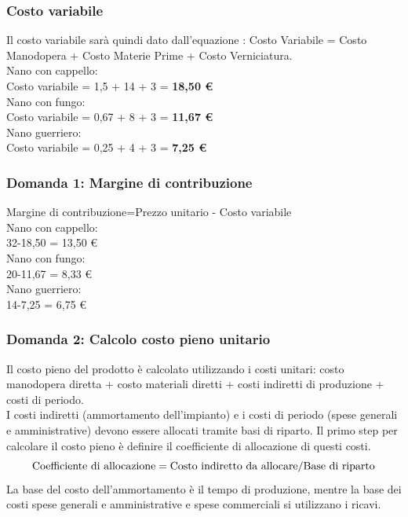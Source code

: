 \documentclass{article}
\begin{document}
\subsubsection*{Costo variabile}
Il costo variabile sarà quindi dato dall'equazione : Costo Variabile = Costo Manodopera + Costo Materie Prime + Costo Verniciatura.
\vspace*{0.1cm}\\
Nano con cappello:\\
Costo variabile = 1,5 + 14 + 3 = \textbf{18,50 €}
\vspace*{0.1cm}\\
Nano con fungo:\\
Costo variabile = 0,67 + 8 + 3 = \textbf{11,67 €}
\vspace*{0.1cm}\\
Nano guerriero:\\
Costo variabile = 0,25 + 4 + 3 = \textbf{7,25 €}
\vspace*{0.2cm}\\

\subsubsection{Domanda 1: Margine di contribuzione}
Margine di contribuzione=Prezzo unitario - Costo variabile
\vspace*{0.2cm}\\
Nano con cappello:\\
32-18,50 = 13,50 \euro 
\vspace*{0.1cm}\\
Nano con fungo:\\
20-11,67 = 8,33 \euro 
\vspace*{0.1cm}\\
Nano guerriero:\\
14-7,25 = 6,75 \euro 

\subsubsection{Domanda 2: Calcolo costo pieno unitario}
Il costo pieno del prodotto è calcolato utilizzando i costi unitari: costo manodopera diretta + costo materiali diretti + costi indiretti di produzione + costi di periodo.\\
I costi indiretti (ammortamento dell'impianto) e i costi di periodo (spese generali e amministrative) devono essere allocati tramite basi di riparto. Il primo step per calcolare il costo pieno è definire il coefficiente di allocazione di questi costi.
\[
    \text{Coefficiente di allocazione} = \text{Costo indiretto da allocare}/\text{Base di riparto}
\]
La base del costo dell'ammortamento è il tempo di produzione, mentre la base dei costi spese generali e amministrative e spese commerciali si utilizzano i ricavi.
\end{document}
